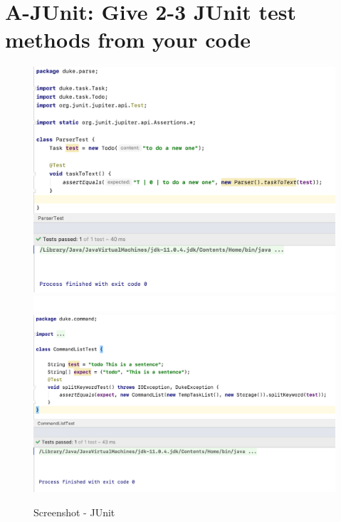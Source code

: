 \documentclass[a4paper,11pt, twoside]{article}
\begin{document}
\begin{table} [htbp]
\section* {A-JUnit: Give 2-3 JUnit test methods from your code} 
\begin{figure}[H]
\centering
\includegraphics[width = 15.4cm]{junit1.png} 
\includegraphics[height = 1.5 cm]{liner.png} 
\includegraphics[width = 15.3cm]{junit2.png}
\caption{Screenshot - JUnit} 
\end{figure} 

\end{table}
\end{document}
